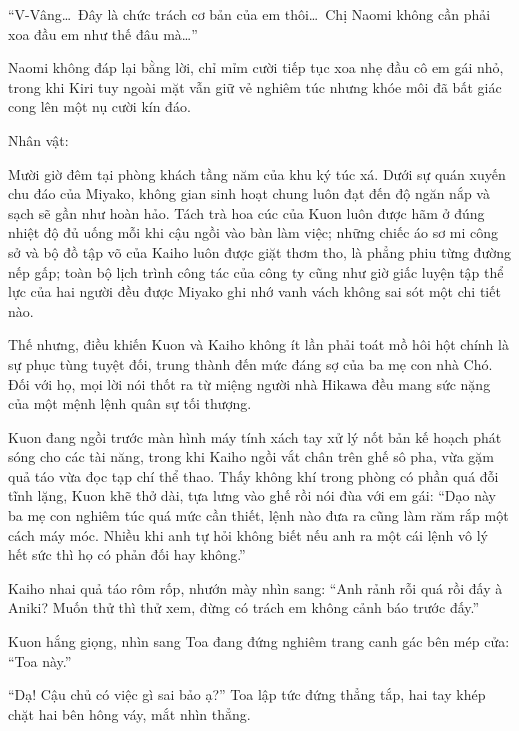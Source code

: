 \documentclass[../main.tex]{subfiles}
\begin{document}
``V-Vâng\dots\ Đây là chức trách cơ bản của em thôi\dots\ Chị Naomi không cần phải xoa đầu em như thế đâu mà\dots''

Naomi không đáp lại bằng lời, chỉ mỉm cười tiếp tục xoa nhẹ đầu cô em gái nhỏ, trong khi Kiri tuy ngoài mặt vẫn giữ vẻ nghiêm túc nhưng khóe môi đã bất giác cong lên một nụ cười kín đáo.

\newpage

\begin{center}
  {\caviar\fontsize{12pt}{12pt}\selectfont Nhân vật:    }
\end{center}

Mười giờ đêm tại phòng khách tầng năm của khu ký túc xá. Dưới sự quán xuyến chu đáo của Miyako, không gian sinh hoạt chung luôn đạt đến độ ngăn nắp và sạch sẽ gần như hoàn hảo. Tách trà hoa cúc của Kuon luôn được hãm ở đúng nhiệt độ đủ uống mỗi khi cậu ngồi vào bàn làm việc; những chiếc áo sơ mi công sở và bộ đồ tập võ của Kaiho luôn được giặt thơm tho, là phẳng phiu từng đường nếp gấp; toàn bộ lịch trình công tác của công ty cũng như giờ giấc luyện tập thể lực của hai người đều được Miyako ghi nhớ vanh vách không sai sót một chi tiết nào.

Thế nhưng, điều khiến Kuon và Kaiho không ít lần phải toát mồ hôi hột chính là sự phục tùng tuyệt đối, trung thành đến mức đáng sợ của ba mẹ con nhà Chó. Đối với họ, mọi lời nói thốt ra từ miệng người nhà Hikawa đều mang sức nặng của một mệnh lệnh quân sự tối thượng.

Kuon đang ngồi trước màn hình máy tính xách tay xử lý nốt bản kế hoạch phát sóng cho các tài năng, trong khi Kaiho ngồi vắt chân trên ghế sô pha, vừa gặm quả táo vừa đọc tạp chí thể thao. Thấy không khí trong phòng có phần quá đỗi tĩnh lặng, Kuon khẽ thở dài, tựa lưng vào ghế rồi nói đùa với em gái: ``Dạo này ba mẹ con nghiêm túc quá mức cần thiết, lệnh nào đưa ra cũng làm răm rắp một cách máy móc. Nhiều khi anh tự hỏi không biết nếu anh ra một cái lệnh vô lý hết sức thì họ có phản đối hay không.''

Kaiho nhai quả táo rôm rốp, nhướn mày nhìn sang: ``Anh rảnh rỗi quá rồi đấy à Aniki? Muốn thử thì thử xem, đừng có trách em không cảnh báo trước đấy.''

Kuon hắng giọng, nhìn sang Toa đang đứng nghiêm trang canh gác bên mép cửa: ``Toa này.''

``Dạ! Cậu chủ có việc gì sai bảo ạ?'' Toa lập tức đứng thẳng tắp, hai tay khép chặt hai bên hông váy, mắt nhìn thẳng.
\end{document}

